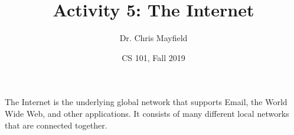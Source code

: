 \documentclass[12pt]{article}
\title{Activity 5: The Internet}
\author{Dr. Chris Mayfield}
\date{CS 101, Fall 2019}
\begin{document}
\maketitle

The Internet is the underlying global network that supports Email, the World Wide Web, and other applications. It consists of many different local networks that are connected together.


\newpage

\end{document}
